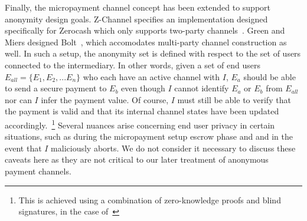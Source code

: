 Finally, the micropayment channel concept has been extended to support anonymity
design goals. Z-Channel specifies an implementation designed specifically for
Zerocash which only supports two-party channels~\cite{zhang2017z}. Green and
Miers designed Bolt~\cite{green2017bolt}, which accomodates multi-party channel construction as
well. In such a setup, the anonymity set is defined with
respect to the set of users connected to the intermediary. In other words, given
a set of end users $E_{all} = \{E_1, E_2, ... E_n\}$ who each have an active
channel with $I$, $E_a$ should be able to send a secure payment to $E_b$ even
though $I$ cannot identify $E_a$ or $E_b$ from $E_{all}$ nor can $I$ infer the
payment value. Of course, $I$ must still be able to verify that the payment is
valid and that its internal channel states have been updated
accordingly.~\footnote{This is achieved using a combination of zero-knowledge
  proofs and blind signatures, in the case of~\cite{green2017bolt}} Several
nuances arise concerning end user privacy in certain situations, such as during
the micropayment setup escrow phase and and in the event that $I$ maliciously
aborts. We do not consider it necessary to discuss these caveats here as they
are not critical to our later treatment of anonymous payment channels.
